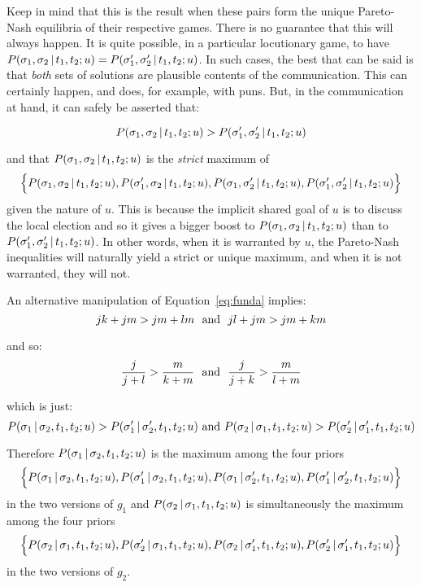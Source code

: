Keep in mind that this is the result when these pairs form the unique Pareto-Nash equilibria of their respective games. There is no guarantee that this will always happen. It is quite possible, in a particular locutionary game, to have $P(\sigma_1,\sigma_2 \,|\, t_1, t_2; u) = P(\sigma'_1,\sigma'_2 \,|\, t_1, t_2; u)$. In such cases, the best that can be said is that \emph{both} sets of solutions are plausible contents of the communication. This can certainly happen, and does, for example, with puns. But, in the communication at hand, it can safely be asserted that: 

\[ P(\sigma_1,\sigma_2 \,|\, t_1, t_2; u) > P(\sigma'_1,\sigma'_2 \,|\, t_1, t_2; u) \]

\noindent and that $P(\sigma_1,\sigma_2 \,|\, t_1, t_2; u)$ is the \emph{strict} maximum of \[\Bigl\{P(\sigma_1,\sigma_2 \cond t_1, t_2; u), P(\sigma'_1,\sigma_2 \cond t_1, t_2; u), P(\sigma_1,\sigma'_2 \cond t_1, t_2; u), \break P(\sigma'_1,\sigma'_2 \cond t_1, t_2; u)\Bigr\}\] given the nature of $u$. This is because the implicit shared goal of $u$ is to discuss the local election and so it gives a bigger boost to $P(\sigma_1,\sigma_2 \,|\, t_1, t_2; u)$ than to $P(\sigma'_1,\sigma'_2 \,|\, t_1, t_2; u)$. In other words, when it is warranted by $u$, the Pareto-Nash inequalities will naturally yield a strict or unique maximum, and when it is not warranted, they will not.

An alternative manipulation of Equation~\ref{eq:funda} implies:
\[ jk + jm > jm + lm\ \ \hbox{and}\ \ jl + jm > jm + km \]

\noindent and so:
\[ \frac{j}{j + l} > \frac{m}{k + m}\ \ \hbox{and}\ \ \frac{j}{j + k} > \frac{m}{l + m} \]

\noindent which is just:
\[ P(\sigma_1 \cond \sigma_2, t_1, t_2; u) > P(\sigma'_1 \cond \sigma'_2, t_1, t_2; u)\ \hbox{and}\ P(\sigma_2 \cond \sigma_1, t_1, t_2; u) > P(\sigma'_2 \cond \sigma'_1, t_1, t_2; u) \]

\noindent Therefore $P(\sigma_1 \,|\, \sigma_2, t_1, t_2; u)$ is the maximum among the four priors 
\[\Bigl\{P(\sigma_1 \cond \sigma_2, t_1, t_2; u), P(\sigma'_1 \cond \sigma_2, t_1, t_2; u),\break P(\sigma_1 \cond \sigma'_2, t_1, t_2; u), P(\sigma'_1 \cond \sigma'_2, t_1, t_2; u)\Bigr\}\]
in the two versions of $g_1$ and $P(\sigma_2 \,|\, \sigma_1, t_1, t_2; u)$ is simultaneously the maximum among the four priors \[\Bigl\{P(\sigma_2 \,|\, \sigma_1, t_1, t_2; u), P(\sigma'_2 \,|\, \sigma_1, t_1, t_2; u), P(\sigma_2 \,|\, \sigma'_1, t_1, t_2; u), P(\sigma'_2 \,|\, \sigma'_1, t_1, t_2; u)\Bigr\}\]
in the two versions of $g_2$.

